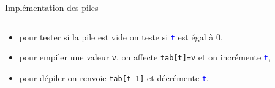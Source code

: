 \documentclass[10pt]{beamer}
\begin{document}
\begin{frame}[fragile]{\Ctitle}{\stitle}
\begin{block}{Implémentation des piles}
\begin{itemize}
{\begin{tabularx}{0.9\textwidth}{|Y|Y|Y|Y|Y|Y|}
					\end{tabularx}
				}
				\begin{itemize}
					\item<8-> pour tester si la pile est vide on teste si \textcolor{blue}{\tt t} est égal à 0,
					\item<9-> pour empiler une valeur {\tt v}, on affecte {\tt tab[t]=v} et on incrémente \textcolor{blue}{\tt t},
						\onslide<10->{\ncline[linecolor=OliveGreen,nodesepA=0.1cm,nodesepB=0.4cm,offset=-2pt]{->}{s}{t} \naput[labelsep=0.1pt]{\textcolor{OliveGreen}{\tiny empiler}}}
					\item<11-> pour dépiler on renvoie {\tt tab[t-1]} et décrémente \textcolor{blue}{\tt t}.
						\onslide<12->{\ncline[linecolor=BrickRed,nodesepA=0.1cm,nodesepB=0.4cm,offset=2pt]{->}{s}{h} \nbput[labelsep=0.1pt]{\textcolor{BrickRed}{\tiny dépiler}}}
				\end{itemize}
		\end{itemize}
	\end{block}
\end{frame}
\end{document}

